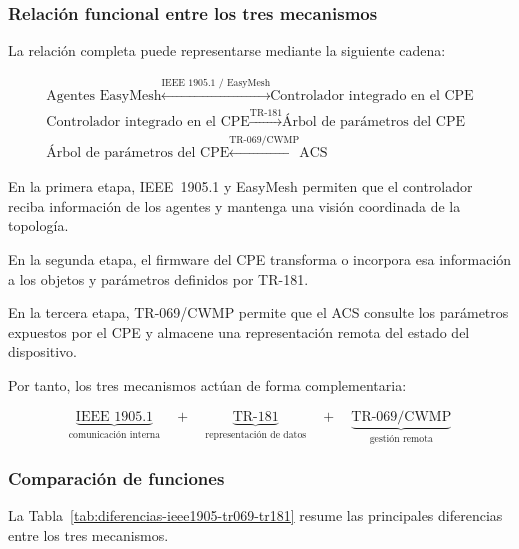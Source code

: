 \subsubsection*{Relación funcional entre los tres mecanismos}

La relación completa puede representarse mediante la siguiente cadena:

\[
\boxed{
\begin{gathered}
\text{Agentes EasyMesh}
\overset{\text{IEEE~1905.1 / EasyMesh}}{\longleftrightarrow}
\text{Controlador integrado en el CPE}
\\[0.2cm]
\text{Controlador integrado en el CPE}
\overset{\text{TR-181}}{\longrightarrow}
\text{Árbol de parámetros del CPE}
\\[0.2cm]
\text{Árbol de parámetros del CPE}
\overset{\text{TR-069/CWMP}}{\longleftrightarrow}
\text{ACS}
\end{gathered}
}
\]

En la primera etapa, IEEE~1905.1 y EasyMesh permiten que el controlador
reciba información de los agentes y mantenga una visión coordinada de la
topología.

En la segunda etapa, el firmware del CPE transforma o incorpora esa
información a los objetos y parámetros definidos por TR-181.

En la tercera etapa, TR-069/CWMP permite que el ACS consulte los
parámetros expuestos por el CPE y almacene una representación remota del
estado del dispositivo.

Por tanto, los tres mecanismos actúan de forma complementaria:

\[
    \underbrace{\text{IEEE~1905.1}}_{\text{comunicación interna}}
    \quad+\quad
    \underbrace{\text{TR-181}}_{\text{representación de datos}}
    \quad+\quad
    \underbrace{\text{TR-069/CWMP}}_{\text{gestión remota}}
\]


\subsubsection*{Comparación de funciones}

La Tabla~\ref{tab:diferencias-ieee1905-tr069-tr181} resume las
principales diferencias entre los tres mecanismos.


